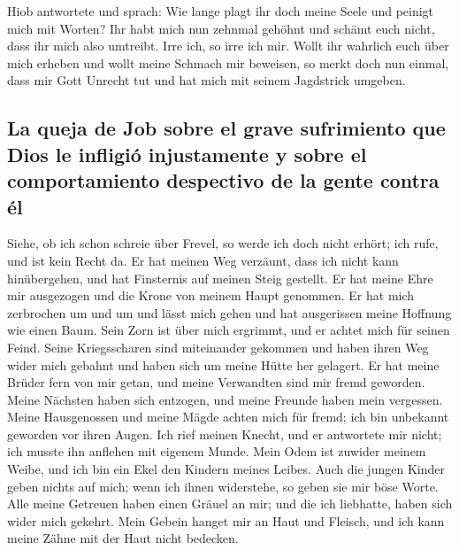  Hiob antwortete und sprach:  Wie lange
plagt ihr doch meine Seele und peinigt mich mit Worten? 
Ihr habt mich nun zehnmal gehöhnt und schämt euch nicht, dass ihr mich
also umtreibt.  Irre ich, so irre ich mir. 
Wollt ihr wahrlich euch über mich erheben und wollt meine Schmach mir
beweisen,  so merkt doch nun einmal, dass mir Gott Unrecht
tut und hat mich mit seinem Jagdstrick umgeben.

\hypertarget{la-queja-de-job-sobre-el-grave-sufrimiento-que-dios-le-infligiuxf3-injustamente-y-sobre-el-comportamiento-despectivo-de-la-gente-contra-uxe9l}{%
\subsection{La queja de Job sobre el grave sufrimiento que Dios le
infligió injustamente y sobre el comportamiento despectivo de la gente
contra
él}\label{la-queja-de-job-sobre-el-grave-sufrimiento-que-dios-le-infligiuxf3-injustamente-y-sobre-el-comportamiento-despectivo-de-la-gente-contra-uxe9l}}

 Siehe, ob ich schon schreie über Frevel, so werde ich
doch nicht erhört; ich rufe, und ist kein Recht da.  Er
hat meinen Weg verzäunt, dass ich nicht kann hinübergehen, und hat
Finsternis auf meinen Steig gestellt.  Er hat meine Ehre
mir ausgezogen und die Krone von meinem Haupt genommen. 
Er hat mich zerbrochen um und um und lässt mich gehen und hat
ausgerissen meine Hoffnung wie einen Baum.  Sein Zorn ist
über mich ergrimmt, und er achtet mich für seinen Feind. 
Seine Kriegsscharen sind miteinander gekommen und haben ihren Weg wider
mich gebahnt und haben sich um meine Hütte her gelagert. 
Er hat meine Brüder fern von mir getan, und meine Verwandten sind mir
fremd geworden.  Meine Nächsten haben sich entzogen, und
meine Freunde haben mein vergessen.  Meine Hausgenossen
und meine Mägde achten mich für fremd; ich bin unbekannt geworden vor
ihren Augen.  Ich rief meinen Knecht, und er antwortete
mir nicht; ich musste ihn anflehen mit eigenem Munde. 
Mein Odem ist zuwider meinem Weibe, und ich bin ein Ekel den Kindern
meines Leibes.  Auch die jungen Kinder geben nichts auf
mich; wenn ich ihnen widerstehe, so geben sie mir böse Worte.
 Alle meine Getreuen haben einen Gräuel an mir; und die
ich liebhatte, haben sich wider mich gekehrt.  Mein
Gebein hanget mir an Haut und Fleisch, und ich kann meine Zähne mit der
Haut nicht bedecken.

